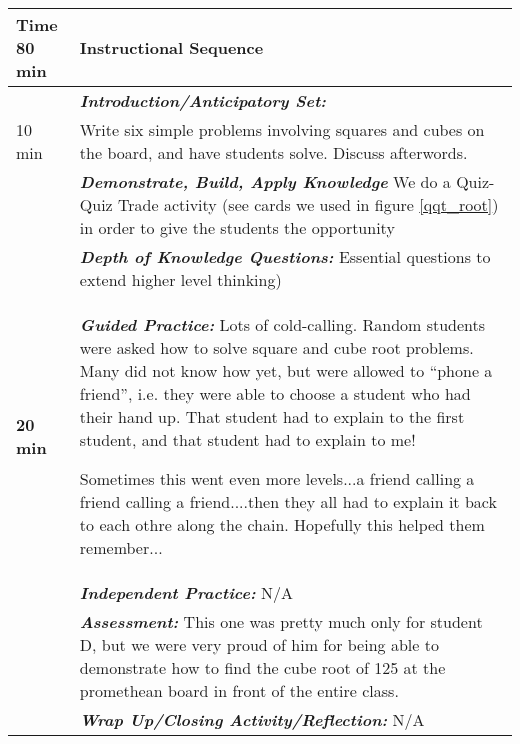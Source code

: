 \pagebreak

\begin{tabularx}{\textwidth}{|p{0.5in}|X|}
  \hline
  
  \centerline{\textbf{\large Time} 80 min}
  &
  \textbf{\large Instructional Sequence } \\
  \hline
  
  \textbf{} &  \textbf{\em Introduction/Anticipatory Set:}  \\
  10 min & Write six simple problems involving squares and cubes on the board, and have students solve.  Discuss afterwords.\\
  \hline
  
  \textbf{}
  &
  \textbf{\em Demonstrate, Build, Apply Knowledge} We do a Quiz-Quiz
  Trade activity (see cards we used in figure \ref{qqt_root}) in order
  to give the students the opportunity \\
  
  \hline
  
  \textbf{} & \textbf{\em Depth of Knowledge Questions:} {\tiny
    Essential questions to extend higher level thinking)} \\
  \hline
  
  \textbf{20 min}
  &
  \textbf{\em Guided Practice:} Lots of cold-calling.  Random students were asked how to solve square and cube root problems.   Many did not know how yet, but were allowed to ``phone a friend'', i.e. they were able to choose a student who had their hand up.  That student had to explain to the first student, and that student had to explain to me!

  Sometimes this went even more levels...a friend calling a friend calling a friend....then they all had to explain it back to each othre along the chain.  Hopefully this helped them remember...
  \\
  \hline
  
  \textbf{} & \textbf{\em Independent Practice:} N/A\\
  \hline
  
  \textbf{} & \textbf{\em Assessment:} This one was pretty much only for student D, but we were very proud of him for being able to demonstrate how to find the cube root of 125 at the promethean board in front of the entire class.  \\
  \hline
  
  \textbf{} & \textbf{\em Wrap Up/Closing Activity/Reflection:} N/A \\
  \hline
  
\end{tabularx}

